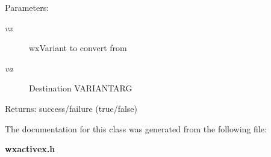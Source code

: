 \begin{Desc}
\item[Parameters:]
\begin{description}
\item[{\em vx}]wx\-Variant to convert from \item[{\em va}]Destination VARIANTARG \end{description}
\end{Desc}
\begin{Desc}
\item[Returns:]success/failure (true/false) \end{Desc}


The documentation for this class was generated from the following file:\begin{CompactItemize}
\item 
{\bf wxactivex.h}\end{CompactItemize}
